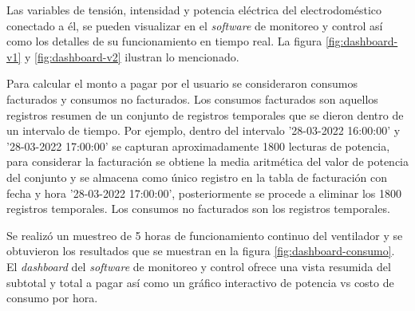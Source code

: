 Las variables de tensión, intensidad y potencia eléctrica del electrodoméstico conectado a él, se pueden visualizar en el \emph{software} de monitoreo y control así como los detalles de su funcionamiento en tiempo real. La figura \ref{fig:dashboard-v1} y \ref{fig:dashboard-v2} ilustran lo mencionado.

Para calcular el monto a pagar por el usuario se consideraron consumos facturados y consumos no facturados. Los consumos facturados son aquellos registros resumen de un conjunto de registros temporales que se dieron dentro de un intervalo de tiempo. Por ejemplo, dentro del intervalo '28-03-2022 16:00:00' y '28-03-2022 17:00:00' se capturan aproximadamente 1800 lecturas de potencia, para considerar la facturación se obtiene la media aritmética del valor de potencia del conjunto y se almacena como único registro en la tabla de facturación con fecha y hora '28-03-2022 17:00:00', posteriormente se procede a eliminar los 1800 registros temporales. Los consumos no facturados son los registros temporales. 

Se realizó un muestreo de 5 horas de funcionamiento continuo del ventilador y se obtuvieron los resultados que se muestran en la figura \ref{fig:dashboard-consumo}. El \emph{dashboard} del \emph{software} de monitoreo y control ofrece una vista resumida del subtotal y total a pagar así como un gráfico interactivo de potencia vs costo de consumo por hora.

